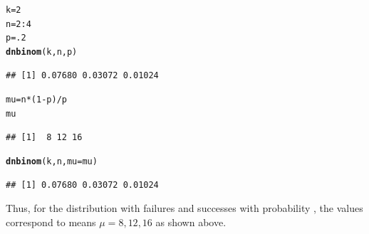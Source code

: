 \documentclass[11pt]{book}\usepackage[]{graphicx}\usepackage[]{color}
\makeatletter
\newcommand{\hlnum}[1]{\textcolor[rgb]{0.686,0.059,0.569}{#1}}%
\newcommand{\hlopt}[1]{\textcolor[rgb]{0,0,0}{#1}}%
\newcommand{\hlstd}[1]{\textcolor[rgb]{0.345,0.345,0.345}{#1}}%
\newcommand{\hlkwb}[1]{\textcolor[rgb]{0.69,0.353,0.396}{#1}}%
\newcommand{\hlkwc}[1]{\textcolor[rgb]{0.333,0.667,0.333}{#1}}%
\newcommand{\hlkwd}[1]{\textcolor[rgb]{0.737,0.353,0.396}{\textbf{#1}}}%
\newenvironment{kframe}{%
 \def\at@end@of@kframe{}%
 \ifinner\ifhmode%
  \def\at@end@of@kframe{\end{minipage}}%
  \begin{minipage}{\columnwidth}%
 \fi\fi%
 \def\FrameCommand##1{\hskip\@totalleftmargin \hskip-\fboxsep
 \colorbox{shadecolor}{##1}\hskip-\fboxsep
     \hskip-\linewidth \hskip-\@totalleftmargin \hskip\columnwidth}%
 \MakeFramed {\advance\hsize-\width
   \@totalleftmargin\z@ \linewidth\hsize
   \@setminipage}}%
 {\par\unskip\endMakeFramed%
 \at@end@of@kframe}
\newenvironment{knitrout}{}{} %
\renewenvironment{knitrout}{\small\renewcommand{\baselinestretch}{.85}}{} %
\makeatother
\begin{document}
\begin{knitrout}
\color{fgcolor}\begin{kframe}
\begin{alltt}
\hlstd{k} \hlkwb{=} \hlnum{2}
\hlstd{n} \hlkwb{=} \hlnum{2}\hlopt{:}\hlnum{4}
\hlstd{p} \hlkwb{=} \hlnum{.2}
\hlkwd{dnbinom}\hlstd{( k, n,  p)}
\end{alltt}
\begin{verbatim}
## [1] 0.07680 0.03072 0.01024
\end{verbatim}
\begin{alltt}
\hlstd{mu} \hlkwb{=} \hlstd{n}\hlopt{*}\hlstd{(}\hlnum{1}\hlopt{-}\hlstd{p)}\hlopt{/}\hlstd{p}
\hlstd{mu}
\end{alltt}
\begin{verbatim}
## [1]  8 12 16
\end{verbatim}
\begin{alltt}
\hlkwd{dnbinom}\hlstd{( k, n,} \hlkwc{mu}\hlstd{=mu)}
\end{alltt}
\begin{verbatim}
## [1] 0.07680 0.03072 0.01024
\end{verbatim}
\end{kframe}
\end{knitrout}

Thus, for the distribution with  failures and
  successes with probability ,
the values  correspond to means $\mu= 8, 12, 16$
as shown above.
\end{document}
